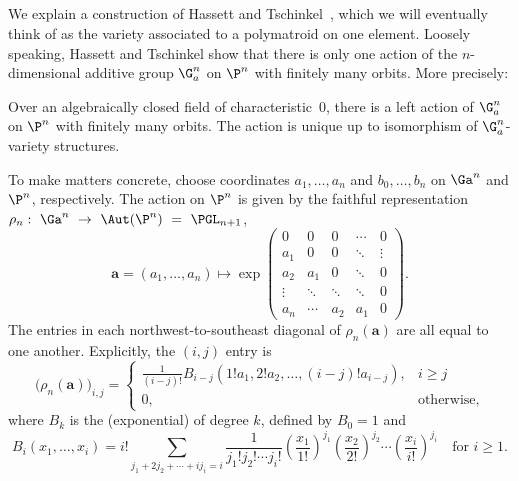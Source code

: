 \subsection{}\label{sec_HT}
We explain a construction of Hassett and Tschinkel~\cite{HT99}, which we will eventually think of as the variety associated to a polymatroid on one element.
Loosely speaking, Hassett and Tschinkel show that there is only one action of the $n$-dimensional additive group $\G_a^n$ on $\P^n$ with finitely many orbits. More precisely:
\begin{theo}[{\cite[Proposition 3.7]{HT99}}]\label{HT}
  Over an algebraically closed field of characteristic~0, there is a left action of $\G_a^n$ on $\P^n$ with finitely many orbits.
  The action is unique up to isomorphism of $\G_a^n$-variety structures.
\end{theo}
To make matters concrete, choose coordinates $a_1, \ldots, a_n$ and $b_0,\ldots, b_n$ on  $\Ga^n$ and $\P^n$, respectively.
The action on $\P^n$ is given by the faithful representation $\rho_n:~\Ga^n~\to~\Aut(\P^n)~=~\PGL_{n+1}$,
\[
  \mathbf a = (a_1, \ldots, a_n) \mapsto \exp
                                  \begin{pmatrix}
                                    0 & 0 & 0 & \cdots & 0\\
                                    a_1 & 0 & 0 & \ddots & \vdots\\
                                    a_2 & a_1 & 0 & \ddots & 0 \\
                                    \vdots & \ddots & \ddots & \ddots & 0 \\
                                    a_n & \cdots & a_2 & a_1 & 0
                                  \end{pmatrix}.
\]
The entries in each northwest-to-southeast diagonal of $\rho_n(\mathbf a)$ are all equal to one another.
Explicitly, the $(i,j)$ entry is
\[
  \big(\rho_n(\mathbf a)\big)_{i,j} =
  \begin{cases}
    \frac{1}{(i-j)!} B_{i-j}(1! a_1, 2! a_2, \ldots, (i-j)! a_{i-j}), & i \geq j \\
    0, & \text{otherwise,}
  \end{cases}
\]
where $B_k$ is the (exponential)  of degree $k$, defined by  $B_0 = 1$ and
\[
  B_i(x_1, \ldots, x_i) = i! \sum_{j_1+2j_2 + \cdots + i j_i = i} \frac{1}{j_1! j_2! \cdots j_i!}
  \left(\frac{x_1}{1!}\right)^{j_1}
  \left(\frac{x_2}{2!}\right)^{j_2} \cdots
  \left(\frac{x_i}{i!}\right)^{j_i}
  \quad \text{for $i \geq 1$.}
\]
